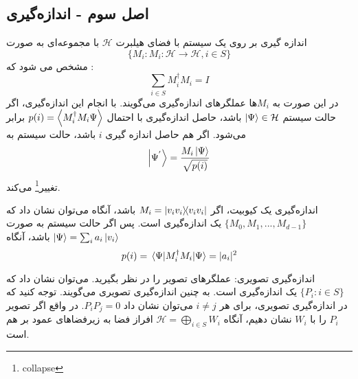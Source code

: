   \subsection{اصل سوم - اندازه‌گیری}
اندازه گیری بر روی یک سیستم با فضای هیلبرت $\mathcal{H}$ با مجموعه‌ای به صورت 
\begin{equation}
	\{ M_{i}: M_{i}: \mathcal{H} \to \mathcal{H}, i \in S \}
\end{equation}
 مشخص می شود که :
 \begin{equation}
 	\sum_{i \in S} M_{i}^{\dagger}M_{i} = I 
 \end{equation}
 در این صورت به $M_{i}$ها عملگرهای اندازه‌گیری می‌گویند. با انجام این اندازه‌گیری، اگر حالت سیستم $\ket{\Psi} \in \mathcal{H}$ باشد، حاصل اندازه‌گیری با احتمال $p(i) = \ev{M_{i}^{\dagger}M_{i}{\Psi}}$ برابر می‌شود. اگر هم حاصل اندازه گیری $i$ باشد، حالت سیستم به 
 \begin{equation}
 	\ket{\Psi^{'}} = \frac{M_{i}\ket{\Psi}}{\sqrt{p(i)}}
\end{equation}  
تغییر\footnote{collapse} می‌کند.

\begin{example}
اندازه‌گیری یک کیوبیت، اگر $M_{i} = \dyad{v_{i}{v_i}}$ باشد، آنگاه می‌توان نشان داد که $\{ M_{0}, M_{1},...,M_{d-1}\}$ یک اندازه‌گیری است. 
پس اگر حالت سیستم به صورت $\ket{\Psi} = \sum_{i} a_{i}\ket{v_{i}}$ باشد، آنگاه
\begin{equation}
	p(i) = \ev{M_{i}^{\dagger}M_{i}}{\Psi} = |a_{i}|^{2}
\end{equation}
\end{example}

\begin{example}
اندازه‌گیری تصویری: عملگرهای تصویر را در نظر بگیرید. می‌توان نشان داد که $\{ P_{i}: i \in S \}$ یک اندازه‌گیری است. به چنین اندازه‌گیری تصویری می‌گویند. توجه کنید که در اندازه‌گیری تصویری، برای هر $i \ne j$ می‌توان نشان داد $P_{i}P_{j} = 0$. در واقع اگر تصویر $P_{i}$ را با $W_{i}$ نشان دهیم، آنگاه $\mathcal{H} = \bigoplus_{i \in S} W_{i}$ افراز فضا به زیرفضاهای عمود بر هم است. 
\end{example}

